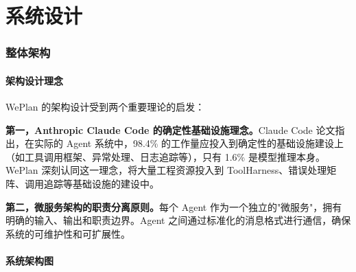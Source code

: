 \documentclass[12pt,a4paper]{ctexart}
\begin{document}
\newpage


\part{系统设计}

\section{整体架构}

\subsection{架构设计理念}

WePlan 的架构设计受到两个重要理论的启发：

\textbf{第一，Anthropic Claude Code 的确定性基础设施理念。}Claude Code 论文指出，在实际的 Agent 系统中，98.4\% 的工作量应投入到确定性的基础设施建设上（如工具调用框架、异常处理、日志追踪等），只有 1.6\% 是模型推理本身。WePlan 深刻认同这一理念，将大量工程资源投入到 ToolHarness、错误处理矩阵、调用追踪等基础设施的建设中。

\textbf{第二，微服务架构的职责分离原则。}每个 Agent 作为一个独立的"微服务"，拥有明确的输入、输出和职责边界。Agent 之间通过标准化的消息格式进行通信，确保系统的可维护性和可扩展性。

\subsection{系统架构图}
\end{document}
